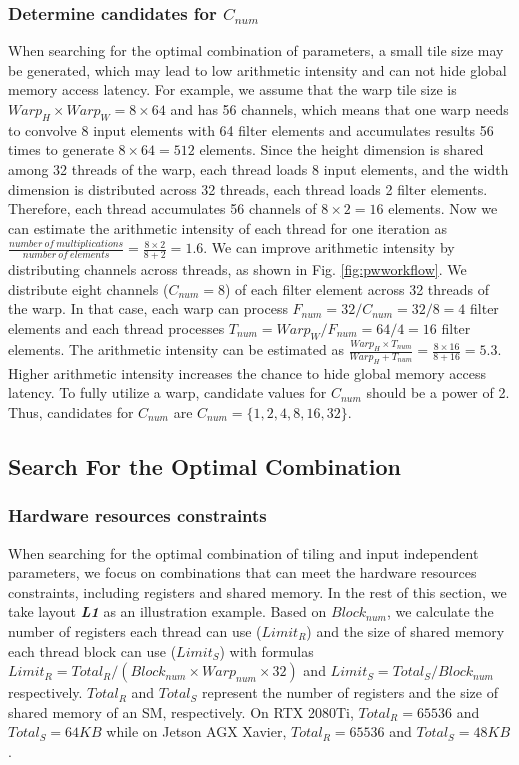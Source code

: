 \subsubsection{Determine candidates for $C_{num}$\label{sec:cnum}}
When searching for the optimal combination of parameters, a small tile size may be generated, which may lead to low arithmetic intensity and can not hide global memory access latency.
 For example, we assume that the warp tile size is $Warp_H \times Warp_W = 8 \times 64$ and has 56 channels, which means that one warp needs to convolve 8 input elements with 64 filter elements and accumulates results 56 times to generate $8 \times 64=512$ elements. Since the height dimension is shared among 32 threads of the warp, each thread loads 8 input elements, and the width dimension is distributed across 32 threads, each thread loads 2 filter elements. Therefore, each thread accumulates 56 channels of $8 \times 2=16$ elements. Now we can estimate the arithmetic intensity of each thread for one iteration as $\frac{number\ of\ multiplications}{number\ of\ elements}=\frac{8 \times 2}{8 + 2}=1.6$. We can improve arithmetic intensity by distributing channels across threads, as shown in Fig. \ref{fig:pwworkflow}. We distribute eight channels ($C_{num}=8$) of each filter element across 32 threads of the warp.
 In that case, each warp can process $F_{num}=32/C_{num}=32/8=4$ filter elements and each thread processes $T_{num}=Warp_W/F_{num}=64/4=16$ filter elements.
 The arithmetic intensity can be estimated as $\frac{Warp_H \times T_{num}}{Warp_H + T_{num}}=\frac{8 \times 16}{8+16}=5.3$.
 Higher arithmetic intensity increases the chance to hide global memory access latency.
To fully utilize a warp, candidate values for $C_{num}$ should be a power of 2.
Thus, candidates for $C_{num}$ are $C_{num}=\{1,2,4,8,16,32\}$.


\subsection{Search For the Optimal Combination}
\subsubsection{Hardware resources constraints}
When searching for the optimal combination of tiling and input independent parameters, we focus on combinations that can meet the hardware resources constraints,
including registers and shared memory. In the rest of this section, we take layout \textbf{\emph{L1}} as an illustration example. Based on
$Block_{num}$, we calculate the number of registers each thread can use ($Limit_R$) and the size of shared memory each thread block can use
($Limit_S$) with formulas $Limit_R=Total_R/(Block_{num}\times Warp_{num} \times 32)$ and $Limit_S=Total_S/Block_{num}$ respectively.
$Total_R$ and $Total_S$ represent the number of registers and the size of shared memory of an SM, respectively. On RTX 2080Ti,
$Total_R=65536$ and $Total_S=64KB$ while  on Jetson AGX Xavier, $Total_R=65536$ and $Total_S=48KB$.

